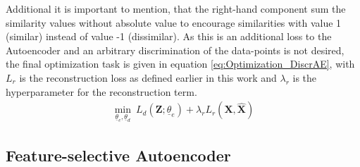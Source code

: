 \documentclass[12pt,DIV14,BCOR12mm,a4paper,footexclude,headinclude,halfparskip-,twoside,openright,openany,cleardoubleempty,idxtotoc,bibtotoc]{scrreprt} %
\numberwithin{equation}{chapter}
\begin{document}
Additional it is important to mention, that the right-hand component sum the similarity values without absolute value to encourage similarities with value 1 (similar) instead of value -1 (dissimilar). As this is an additional loss to the Autoencoder and an arbitrary discrimination of the data-points is not desired, the final optimization task is given in equation \ref{eq:Optimization_DiscrAE}, with $L_r$ is the reconstruction loss as defined earlier in this work and $\lambda_r$ is the hyperparameter for the reconstruction term.
\begin{align}
	 \underset{\underline{\theta}_e, \underline{\theta}_d}\min\ L_d(\mathbf{Z};\underline{\theta}_e)+\lambda_r L_r(\mathbf{X,\hat{\mathbf{X}}})\label{eq:Optimization_DiscrAE}
\end{align}
\subsection{Feature-selective Autoencoder}
\end{document}

